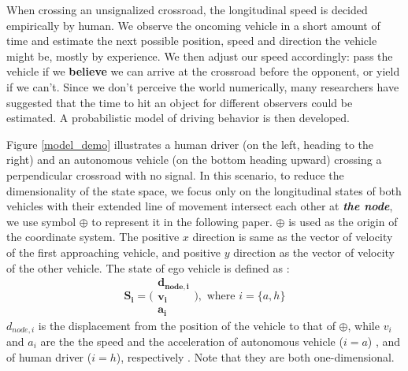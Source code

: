\documentclass[twocolumn,10pt]{asme2e}
\begin{document}
When crossing an unsignalized crossroad, the longitudinal speed is decided empirically by human. We observe the oncoming vehicle in a short amount of time and estimate the next possible position, speed and direction the vehicle might be, mostly by experience. We then adjust our speed accordingly: pass the vehicle if we \textbf{believe} we can arrive at the crossroad before the opponent, or yield if we can't. Since we don't perceive the world numerically, many researchers have suggested that the time to hit an object for different observers could be estimated\cite{cog}. A probabilistic model of driving behavior is then developed.

 Figure \ref{model_demo} illustrates a human driver (on the left, heading to the right) and an autonomous vehicle (on the bottom heading upward) crossing a perpendicular crossroad with no signal. In this scenario, to reduce the dimensionality of the state space, we focus only on the longitudinal states of both vehicles with their extended line of movement intersect each other at  \textbf{\emph {the node}}, we use symbol $\oplus$ to represent it in the following paper. $\oplus$ is used as the origin of the coordinate system. The positive $x$ direction is same as the vector of velocity of the first approaching vehicle, and positive $y$ direction as the vector of velocity of the other vehicle. The state of ego vehicle is defined as : 
\begin{equation}
\mathbf{S_i} = \Biggl( \begin{array}{c} \mathbf{d_{node,i}} \\ \mathbf{v_i} \\ \mathbf{a_i} \end{array} \Biggr), \mbox{ where }  i=\{a, h\} 
\label{sa}
\end{equation}
$d_{node, i}$ is the displacement from the position of the vehicle to that of $\oplus$, while $v_i$ and $a_i$ are the the speed and the acceleration of autonomous vehicle ($i=a$) , and of human driver ($i=h$), respectively . Note that they are both one-dimensional. 

\end{document}
